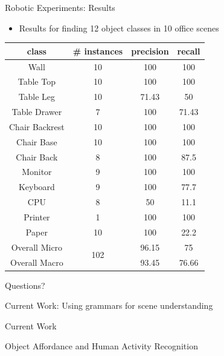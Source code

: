 \documentclass{beamer}
\begin{document}
\begin{frame}{Robotic Experiments: Results}

\begin{itemize}

\item Results for finding 12 object classes in 10 office scenes

\end{itemize}

\begin {center}
{\footnotesize 
\begin{tabular}{c | c | c | c}
class & \# instances & precision & recall \\
\hline
Wall & 10 & 100 & 100 \\
Table Top & 10 & 100  &100  \\
Table Leg & 10 & 71.43 & 50  \\
Table Drawer & 7 & 100 & 71.43 \\
Chair Backrest & 10 & 100 & 100  \\
Chair Base & 10 & 100  & 100 \\
Chair Back & 8 & 100 & 87.5 \\
Monitor & 9  & 100 & 100 \\
Keyboard & 9 & 100 & 77.7 \\
CPU & 8 & 50 & 11.1 \\ 
Printer & 1 & 100 & 100 \\
Paper & 10 & 100 & 22.2 \\
\hline
Overall Micro & \multirow{2}{*}{102} & 96.15 & 75 \\
Overall Macro & & 93.45 & 76.66 \\

\end{tabular}
}
\end{center}

\end{frame}

\begin{frame}
\begin{center}
{\Huge 
Questions?
}
\end{center}
\end{frame}

\begin{frame}{Current Work: Using grammars for scene understanding}


\end{frame}


\begin{frame}{Current Work}
\begin{center}
{\huge
Object Affordance and Human Activity Recognition
}
\end{center}
\end{frame}
\end{document}

